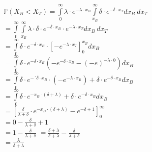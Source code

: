 \documentclass[a4paper]{article}
\begin{document}
$\mathbb{P}(X_B < X_T) = \int\limits_0^\infty \lambda \cdot e^{- \lambda \cdot x_B} \int\limits_{x_B}^{\infty} \delta \cdot e^{- \delta \cdot x_T} dx_B\ dx_T$\\
$= \int\limits_0^{\infty} \int\limits_{x_B}^{\infty} \lambda \cdot \delta \cdot e^{- \delta \cdot x_B} \cdot e^{- \lambda \cdot x_T} dx_B\ dx_T$\\
$= \int\limits_0^\infty \delta \cdot e^{- \delta \cdot x_B} \cdot \left[- e^{ - \lambda \cdot x_T}\right]_0^{x_B} dx_B$\\
$= \int\limits_0^\infty \delta \cdot e^{- \delta \cdot x_B} \left(- e^{- \delta \cdot x_B} - (- e)^{- \lambda \cdot 0}\right) dx_B$\\
$= \int\limits_0^\infty \delta \cdot e^{- ´\delta \cdot x_B} \cdot \left(- e^{- \lambda \cdot x_B}\right) + \delta \cdot e^{- \delta \cdot x_B} dx_B$\\
$= \int\limits_0^\infty \delta \cdot e^{- x_B \cdot (\delta + \lambda)} + \delta \cdot e^{- \delta \cdot x_B} dx_B$\\
$= \left[\frac{\delta}{\lambda + \delta} \cdot e^{- x_B \cdot (\delta + \lambda)} - e^{- \delta + 1}\right]_0^\infty$\\
$= 0 - \frac{\delta}{\lambda + \delta} + 1$\\
$= 1 - \frac{\delta}{\lambda + \delta}$
$= \frac{\delta + \lambda}{\delta + \lambda} - \frac{\delta}{\lambda + \delta}$\\
$= \frac{\lambda}{\delta + \lambda}$
\end{document}
